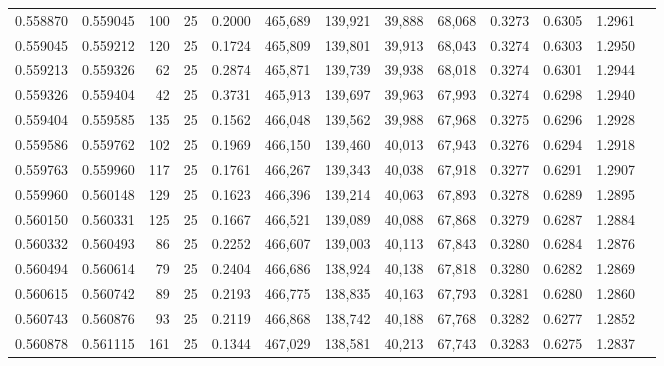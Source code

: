 \begin{tabular}{rrrrrrrrrrrrr}
0.558870 & 0.559045 &   100 &  25 &                                     0.2000 & 465,689 & 139,921 &  39,888 &  68,068 & 0.3273 & 0.6305 & 1.2961 \\
0.559045 & 0.559212 &   120 &  25 &                                     0.1724 & 465,809 & 139,801 &  39,913 &  68,043 & 0.3274 & 0.6303 & 1.2950 \\
0.559213 & 0.559326 &    62 &  25 &                                     0.2874 & 465,871 & 139,739 &  39,938 &  68,018 & 0.3274 & 0.6301 & 1.2944 \\
0.559326 & 0.559404 &    42 &  25 &                                     0.3731 & 465,913 & 139,697 &  39,963 &  67,993 & 0.3274 & 0.6298 & 1.2940 \\
0.559404 & 0.559585 &   135 &  25 &                                     0.1562 & 466,048 & 139,562 &  39,988 &  67,968 & 0.3275 & 0.6296 & 1.2928 \\
0.559586 & 0.559762 &   102 &  25 &                                     0.1969 & 466,150 & 139,460 &  40,013 &  67,943 & 0.3276 & 0.6294 & 1.2918 \\
0.559763 & 0.559960 &   117 &  25 &                                     0.1761 & 466,267 & 139,343 &  40,038 &  67,918 & 0.3277 & 0.6291 & 1.2907 \\
0.559960 & 0.560148 &   129 &  25 &                                     0.1623 & 466,396 & 139,214 &  40,063 &  67,893 & 0.3278 & 0.6289 & 1.2895 \\
0.560150 & 0.560331 &   125 &  25 &                                     0.1667 & 466,521 & 139,089 &  40,088 &  67,868 & 0.3279 & 0.6287 & 1.2884 \\
0.560332 & 0.560493 &    86 &  25 &                                     0.2252 & 466,607 & 139,003 &  40,113 &  67,843 & 0.3280 & 0.6284 & 1.2876 \\
0.560494 & 0.560614 &    79 &  25 &                                     0.2404 & 466,686 & 138,924 &  40,138 &  67,818 & 0.3280 & 0.6282 & 1.2869 \\
0.560615 & 0.560742 &    89 &  25 &                                     0.2193 & 466,775 & 138,835 &  40,163 &  67,793 & 0.3281 & 0.6280 & 1.2860 \\
0.560743 & 0.560876 &    93 &  25 &                                     0.2119 & 466,868 & 138,742 &  40,188 &  67,768 & 0.3282 & 0.6277 & 1.2852 \\
0.560878 & 0.561115 &   161 &  25 &                                     0.1344 & 467,029 & 138,581 &  40,213 &  67,743 & 0.3283 & 0.6275 & 1.2837 \\

\end{tabular}
